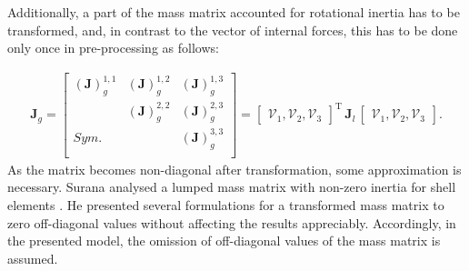 Additionally, a part of the mass matrix accounted for rotational inertia has to be transformed, and, in contrast to the vector of internal forces, this has to be done only once in pre-processing as follows:

\begin{eqnarray}
	\textbf{J}_g=\left [ 
	\begin{array}{ccc}
		\left (\textbf{J}\right)^{1,1}_g & \left (\textbf{J}\right )^{1,2}_g & \left (\textbf{J}\right )^{1,3}_g\\
		& \left (\textbf{J}\right )^{2,2}_g & \left (\textbf{J}\right )^{2,3}_g\\
		Sym. &  & \left (\textbf{J}\right )^{3,3}_g\\
	\end{array}
	\right ]
	=\left[\begin{array}{ccc}
		\mathcal{V}_1, \mathcal{V}_2, \mathcal{V}_3 \end{array}\right ]^{\mathrm{T}}
	\,\textbf{J}_l\,
	\left[\begin{array}{ccc}
		\mathcal{V}_1, \mathcal{V}_2, \mathcal{V}_3 \end{array}\right ].
	\label{eq:inertia}
\end{eqnarray}
%
As the matrix becomes non-diagonal after transformation, some approximation is necessary.
Surana analysed a lumped mass matrix with non-zero inertia for shell elements \cite{surana1980transition}.
He presented several formulations for a transformed mass matrix to zero off-diagonal values without affecting the results appreciably.
Accordingly, in the presented model, the omission of off-diagonal values of the mass matrix is assumed.